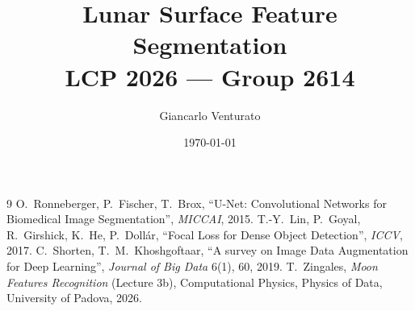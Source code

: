 \documentclass[11pt,a4paper]{article}
\title{Lunar Surface Feature Segmentation\\
\large LCP 2026 --- Group 2614}
\author{Giancarlo Venturato}
\date{\today}
\begin{document}
\maketitle
\tableofcontents
\newpage



\begin{thebibliography}{9}
O.~Ronneberger, P.~Fischer, T.~Brox,
``U-Net: Convolutional Networks for Biomedical Image Segmentation'',
\emph{MICCAI}, 2015.
T.-Y.~Lin, P.~Goyal, R.~Girshick, K.~He, P.~Doll\'ar,
``Focal Loss for Dense Object Detection'', \emph{ICCV}, 2017.
C.~Shorten, T.~M.~Khoshgoftaar,
``A survey on Image Data Augmentation for Deep Learning'',
\emph{Journal of Big Data} 6(1), 60, 2019.
T.~Zingales, \emph{Moon Features Recognition} (Lecture 3b),
Computational Physics, Physics of Data, University of Padova, 2026.
\end{thebibliography}
\end{document}
